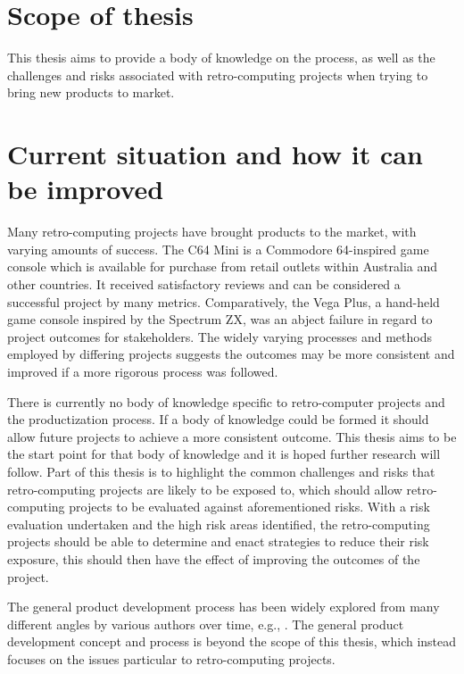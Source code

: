 \section{Scope of thesis}
This thesis aims to provide a body of knowledge on the process, as well as the challenges and risks associated with retro-computing projects when trying to bring new products to market. 


\section{Current situation and how it can be improved}
Many retro-computing projects have brought products to the market, with varying amounts of success. The C64 Mini is a Commodore 64-inspired game console which is available for purchase from retail outlets within Australia and other countries. It received satisfactory reviews and can be considered a successful project by many metrics. Comparatively, the Vega Plus, a hand-held game console inspired by the Spectrum ZX, was an abject failure in regard to project outcomes for stakeholders. The widely varying processes and methods employed by differing projects suggests the outcomes may be more consistent and improved if a more rigorous process was followed. 

There is currently no body of knowledge specific to retro-computer projects and the productization process. If a body of knowledge could be formed it should allow future projects to achieve a more consistent outcome. This thesis aims to be the start point for that body of knowledge and it is hoped further research will follow. Part of this thesis is to highlight the common challenges and risks that retro-computing projects are likely to be exposed to, which should allow retro-computing projects to be evaluated against aforementioned risks. With a risk evaluation undertaken and the high risk areas identified, the retro-computing projects should be able to determine and enact strategies to reduce their risk exposure, this should then have the effect of improving the outcomes of the project.

The general product development process has been widely explored from many different angles by various authors over time, e.g., \cite{veryzer1998discontinuous,imai1984managing,schilling1998managing,morgan2006toyota,zahay2018managerial,sommer2015improved,stark2015product,rajagopalan2017exploring,chahin2016practical}.  The general product development concept and process is beyond the scope of this thesis, which instead focuses on the issues particular to retro-computing projects.


